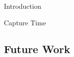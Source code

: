 \documentclass[12pt]{amsart}
\theoremstyle{definition}
\begin{document}
\begin{section}{Introduction}
\begin{section}{Capture Time}


\end{section}


\section{Future Work}\label{sec:open_questions}


\end{section}
\end{document}
